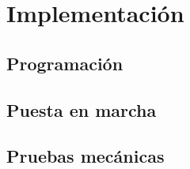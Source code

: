 

\chapter{\textcolor{Azul}{Implementación}}

\section{Programación}

\section{Puesta en marcha}

\section{Pruebas mecánicas}